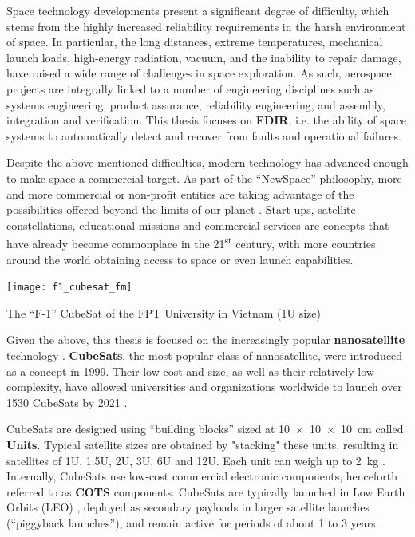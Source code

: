 \documentclass[a4paper,nobib]{tufte-book}
\def\acusepage#1{}
\begin{document}
Space technology developments present a significant degree of difficulty, which stems from the highly increased reliability requirements in the harsh environment of space. In particular, the long distances, extreme temperatures, mechanical launch loads, high-energy radiation, vacuum, and the inability to repair damage, have raised a wide range of challenges in space exploration. As such, aerospace projects are integrally linked to a number of engineering disciplines such as systems engineering, product assurance, reliability engineering, and assembly, integration and verification. This thesis focuses on \textbf{\acf{FDIR}}, i.e. the ability of space systems to automatically detect and recover from faults and operational failures.%
	
Despite the above-mentioned difficulties, modern technology has advanced enough to make space a commercial target. As part of the ``NewSpace'' philosophy, more and more commercial or non-profit entities are taking advantage of the possibilities offered beyond the limits of our planet \autocite{denis_new_space_2020}. Start-ups, satellite constellations, educational missions and commercial services are concepts that have already become commonplace in the 21\textsuperscript{st} century, with more countries around the world obtaining access to space or even launch capabilities.
	
\begin{marginfigure}
	\texttt{[image: f1\_cubesat\_fm]}
	\caption{The ``F-1'' CubeSat of the FPT University in Vietnam (1U size)}
	\label{fig:cubesat}
\end{marginfigure}

Given the above, this thesis is focused on the increasingly popular \textbf{nanosatellite} technology \autocite{sweeting_modern_small_2018a}. \textbf{CubeSats}, the most popular class of nanosatellite, were introduced as a concept in 1999. Their low cost and size, as well as their relatively low complexity, have allowed universities and organizations worldwide to launch over \SI{1530}{} CubeSats by 2021 \autocite{swartwout_cubesat_database_2021}.
	
CubeSats are designed using ``building blocks'' sized at \SI[product-units = single]{10 x 10 x 10}{\centi\metre} called \textbf{Units}. Typical satellite sizes are obtained by "stacking" these units, resulting in satellites of 1U, 1.5U, 2U, 3U, 6U and 12U. Each unit can weigh up to \SI{2}{\kilogram} \autocite{CDS14}. Internally,  CubeSats use low-cost commercial electronic components, henceforth referred to as \textbf{\acf{COTS}} components. CubeSats are typically launched in Low Earth Orbits (\acs{LEO}) \autocite{anthopoulos_orbital_analysis_2020,riebeek_catalog_earth_2009}, deployed as secondary payloads in larger satellite launches (``piggyback launches''), and remain active for periods of about 1 to 3 years.
\end{document}
